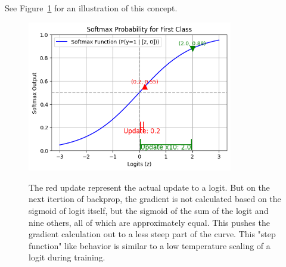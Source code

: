 \documentclass[twoside,11pt]{article}
\begin{document}
See Figure~\ref{fig:temperature_grad} for an illustration of this concept.

\begin{figure}[htbp]
  \centering
  \includegraphics[width=0.8\textwidth]{temperature_grad.png}
  \label{fig:temperature_grad}
  \caption{
    The red update represent the actual update to a logit. But on the next
    itertion of backprop, the gradient is not calculated based on the sigmoid of 
    logit itself, but the sigmoid of the sum of the logit and nine others,
    all of which are approximately equal. This pushes the gradient
    calculation out to a less steep part of the curve. This "step function"
    like behavior is similar to a low temperature scaling of a logit
    during training. 
  }
\end{figure}



\vskip 0.2in

\end{document}
